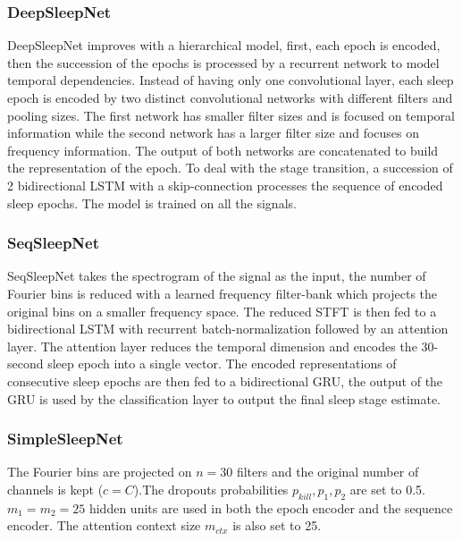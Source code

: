 \documentclass[journal]{IEEEtran}
\begin{document}
\subsubsection{DeepSleepNet \cite{Supratak2017}}
DeepSleepNet improves  \cite{Tsinalis2016a} with a hierarchical model, first, each epoch is encoded, then the succession of the epochs is processed by a recurrent network to model temporal dependencies.
Instead of having only one convolutional layer, each sleep  epoch is encoded by two distinct convolutional networks with different filters and pooling sizes. The first network has smaller filter sizes and is focused on temporal information while the second network has a larger filter size and focuses on frequency information. The output of both networks are concatenated to build the representation of the epoch. To deal with the stage transition, a succession of 2 bidirectional LSTM with a skip-connection processes the sequence of encoded sleep epochs. The model is trained on all the signals.

\subsubsection{SeqSleepNet \cite{Phan2019}}
 SeqSleepNet takes the spectrogram of the signal as the input, the number of Fourier bins is reduced with a learned frequency filter-bank which projects the original bins on a smaller frequency space. The reduced STFT is then fed to a bidirectional LSTM with recurrent batch-normalization \cite{cooijmans2016recurrent} followed by an attention layer. The attention layer reduces the temporal dimension and encodes the 30-second sleep epoch into a single vector. The encoded representations of consecutive sleep epochs are then fed to a bidirectional GRU, the output of the GRU is used by the classification layer to output the final sleep stage estimate.

\subsubsection{SimpleSleepNet}
The Fourier bins are projected on $n=30$ filters and the original number of channels is kept ($c=C$).The dropouts probabilities $p_{kill}, p_1, p_2$ are set to 0.5. $m_1=m_2=25$ hidden units are used in both the epoch encoder and the sequence encoder. The attention context size $m_{ctx}$ is also set to 25.
\end{document}
